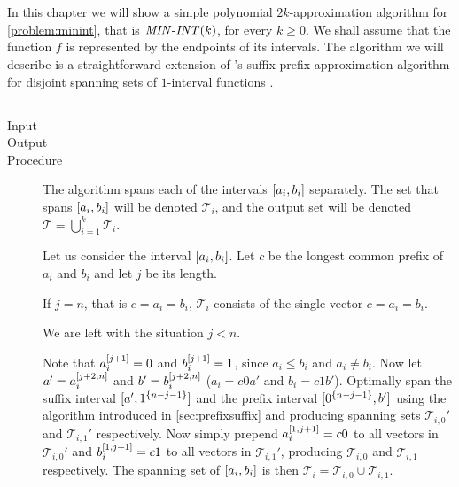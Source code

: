 \chapter{}
\label{chap:2kapprox}

In this chapter
we will show a simple polynomial
$2k$-approximation algorithm for \cref{problem:minint},
that is $\mathit{MIN\text{-}INT} (k)$, for every $k \geq 0$.
We shall assume that the function $f$ is represented by the endpoints of its intervals.
The algorithm we will describe is a straightforward
extension of
\citeauthor{Schieber2005154}'s suffix-prefix
approximation algorithm
for disjoint spanning sets of $1$-interval functions
\citep[Section 6]{Schieber2005154}.

\section{\algdesctitle}

\begin{algorithm}
\label{algorithm:spd}

\hfill

\begin{description}
\item[Input]
\minintinput

\item[Output]
\minintoutput

\item[Procedure]
The algorithm spans each of
the intervals $[a_i, b_i]$ separately.
The set that spans $[a_i, b_i]$ will be denoted
$\mathcal{T}_i$,
and the output set will be denoted
$\mathcal{T} = \bigcup_{i=1}^k{\mathcal{T}_i}$.

Let us consider the interval $[a_i, b_i]$.
Let $c$ be the longest common prefix of $a_i$ and $b_i$
and let $j$ be its length.

If $j = n$, that is $c = a_i = b_i$,
$\mathcal{T}_i$ consists of the single vector
$c = a_i = b_i$.

We are left with the situation $j < n$.

Note that $a_i^{[j+1]} = 0$ and $b_i^{[j+1]} = 1$,
since $a_i \leq b_i$ and $a_i \neq b_i$.
Now let $a' = a_i^{[j+2, n]}$
and $b' = b_i^{[j+2, n]}$
($a_i = c 0 a'$ and $b_i = c 1 b'$).
Optimally span the suffix interval
$[a', 1^{\{n-j-1\}}]$
and the prefix interval
$[0^{\{n-j-1\}}, b']$
using the
algorithm
introduced in \cref{sec:prefixsuffix}
and producing spanning sets
$\mathcal{T}_{i, 0}'$
and $\mathcal{T}_{i, 1}'$ respectively.
Now simply prepend $a_i^{[1, j+1]} = c 0$
to all vectors in $\mathcal{T}_{i, 0}'$
and $b_i^{[1, j+1]} = c 1$
to all vectors in $\mathcal{T}_{i, 1}'$,
producing $\mathcal{T}_{i, 0}$
and $\mathcal{T}_{i, 1}$ respectively.
The spanning set of $[a_i, b_i]$
is then
$\mathcal{T}_i
= \mathcal{T}_{i, 0} \cup \mathcal{T}_{i, 1}$.
\end{description}
\end{algorithm}

